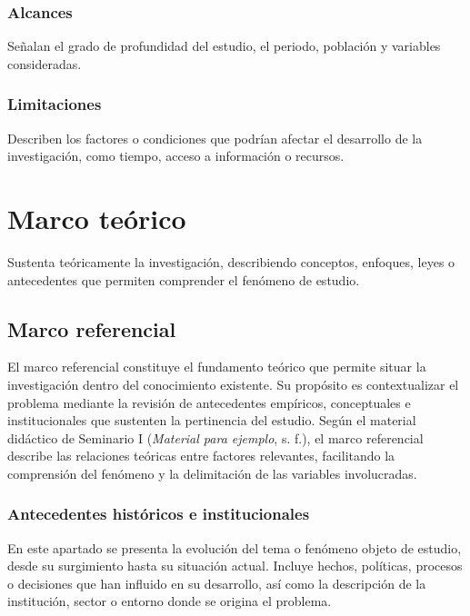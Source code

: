\subsubsection{Alcances}

Señalan el grado de profundidad del estudio, el periodo, población y variables consideradas.

\subsubsection{Limitaciones}

Describen los factores o condiciones que podrían afectar el desarrollo de la investigación, como tiempo, acceso a información o recursos.

\clearpage\section{Marco teórico}

Sustenta teóricamente la investigación, describiendo conceptos, enfoques, leyes o antecedentes que permiten comprender el fenómeno de estudio.

\subsection{Marco referencial}

El marco referencial constituye el fundamento teórico que permite situar la investigación dentro del conocimiento existente. Su propósito es contextualizar el problema mediante la revisión de antecedentes empíricos, conceptuales e institucionales que sustenten la pertinencia del estudio. Según el material didáctico de Seminario I (\emph{Material para ejemplo}, s. f.), el marco referencial describe las relaciones teóricas entre factores relevantes, facilitando la comprensión del fenómeno y la delimitación de las variables involucradas.

\subsubsection{Antecedentes históricos e institucionales}

En este apartado se presenta la evolución del tema o fenómeno objeto de estudio, desde su surgimiento hasta su situación actual. Incluye hechos, políticas, procesos o decisiones que han influido en su desarrollo, así como la descripción de la institución, sector o entorno donde se origina el problema.

